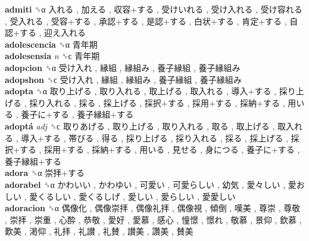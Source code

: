 \textbf{admiti} ␝α   入れる ,  加える ,  収容+する ,  受けいれる ,  受け入れる ,  受け容れる ,  受入れる ,  受容+する ,  承認+する ,  是認+する ,  白状+する ,  肯定+する ,  自認+する ,  迎え入れる   \\
\textbf{adolescencia} ␝α   青年期   \\
\textbf{adolesensia} \emph{n}  ␝ϲ   青年期   \\
\textbf{adopcion} ␝α   受け入れ ,  縁組 ,  縁組み ,  養子縁組 ,  養子縁組み   \\
\textbf{adopshon} ␝ϲ   受け入れ ,  縁組 ,  縁組み ,  養子縁組 ,  養子縁組み   \\
\textbf{adopta} ␝α   取り上げる ,  取り入れる ,  取上げる ,  取入れる ,  導入+する ,  採り上げる ,  採り入れる ,  採る ,  採上げる ,  採択+する ,  採用+する ,  採納+する ,  用いる ,  養子に+する ,  養子縁組+する   \\
\textbf{adoptá} \emph{adj}  ␝ϲ   取りあげる ,  取り上げる ,  取り入れる ,  取る ,  取上げる ,  取入れる ,  導入+する ,  帯びる ,  得る ,  採り上げる ,  採り入れる ,  採る ,  採上げる ,  採択+する ,  採用+する ,  採納+する ,  用いる ,  見せる ,  身につる ,  養子に+する ,  養子縁組+する   \\
\textbf{adora} ␝α   崇拝+する   \\
\textbf{adorabel} ␝α   かわいい ,  かわゆい ,  可愛い ,  可愛らしい ,  幼気 ,  愛々しい ,  愛おしい ,  愛くるしい ,  愛くるしげ ,  愛しい ,  愛らしい ,  愛愛しい   \\
\textbf{adoracion} ␝α   偶像化 ,  偶像崇拝 ,  偶像礼拝 ,  偶像視 ,  傾倒 ,  嘆美 ,  尊崇 ,  尊敬 ,  崇拝 ,  崇重 ,  心酔 ,  恭敬 ,  愛好 ,  愛慕 ,  感心 ,  憧憬 ,  憬れ ,  敬慕 ,  景仰 ,  欽慕 ,  歎美 ,  渇仰 ,  礼拝 ,  礼讃 ,  礼賛 ,  讃美 ,  讚美 ,  賛美   \\
